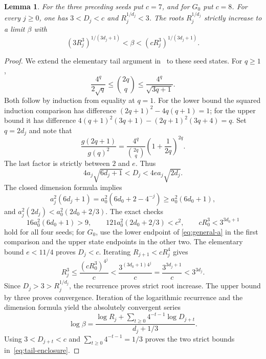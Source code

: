 \documentclass[11pt]{article}
\newtheorem{lemma}[theorem]{Lemma}
\begin{document}
\begin{lemma}\label{lem:tail}
For the three preceding seeds put $c=7$, and for $G_0$ put $c=8$.
For every $j\ge0$, one has $3<D_j<c$ and
$R_j^{1/d_j}<3$. The roots $R_j^{1/d_j}$ strictly increase to a limit
$\beta$ with
\begin{equation}\label{eq:tail-enclosure}
 (3R_j^3)^{1/(3d_j+1)}<\beta<(cR_j^3)^{1/(3d_j+1)}.
\end{equation}
\end{lemma}
\begin{proof}
We extend the elementary tail argument in~\cite[Lemma 9.1]{mxym-calculus}
to these seed states. For $q\ge1$,
\[
 \frac{4^q}{2\sqrt q}\le\binom{2q}{q}
 \le\frac{4^q}{\sqrt{3q+1}}.
\]
Both follow by induction from equality at $q=1$.
For the lower bound the squared induction comparison has difference
$(2q+1)^2-4q(q+1)=1$; for the upper bound it has difference
$4(q+1)^2(3q+1)-(2q+1)^2(3q+4)=q$.
Set $q=2d_j$ and note that
\begin{equation}\label{eq:binomial}
 \frac{g(2q+1)}{g(q)^2}
 =\frac{4^q}{\binom{2q}{q}}
     \left(1+\frac1{2q}\right)^{2q}.
\end{equation}
The last factor is strictly between $2$ and $e$. Thus
\[
 4a_j\sqrt{6d_j+1}<D_j<4ea_j\sqrt{2d_j}.
\]
The closed dimension formula implies
\[
 a_j^2(6d_j+1)=a_0^2(6d_0+2-4^{-j})\ge a_0^2(6d_0+1),
\]
and $a_j^2(2d_j)<a_0^2(2d_0+2/3)$.
The exact checks
\begin{equation}\label{eq:hypotheses}
 16a_0^2(6d_0+1)>9,\qquad
 121a_0^2(2d_0+2/3)<c^2,\qquad
 cR_0^3<3^{3d_0+1}
\end{equation}
hold for all four seeds; for $G_0$, use the lower endpoint of
\eqref{eq:general-a} in the first comparison and the upper state endpoints in the other two. The elementary bound $e<11/4$ proves $D_j<c$.
Iterating $R_{j+1}<cR_j^4$ gives
\[
 R_j^3\le\frac{(cR_0^3)^{4^j}}c
 <\frac{3^{(3d_0+1)4^j}}c
 =\frac{3^{3d_j+1}}c<3^{3d_j}.
\]
Since $D_j>3>R_j^{1/d_j}$, the recurrence proves strict root increase.
The upper bound by three proves convergence. Iteration of the logarithmic
recurrence and the dimension formula yield the absolutely convergent series
\[
 \log\beta=
 \frac{\log R_j+\sum_{t\ge0}4^{-t-1}\log D_{j+t}}{d_j+1/3}.
\]
Using $3<D_{j+t}<c$ and $\sum_{t\ge0}4^{-t-1}=1/3$ proves
the two strict bounds in~\eqref{eq:tail-enclosure}.
\end{proof}
\end{document}
